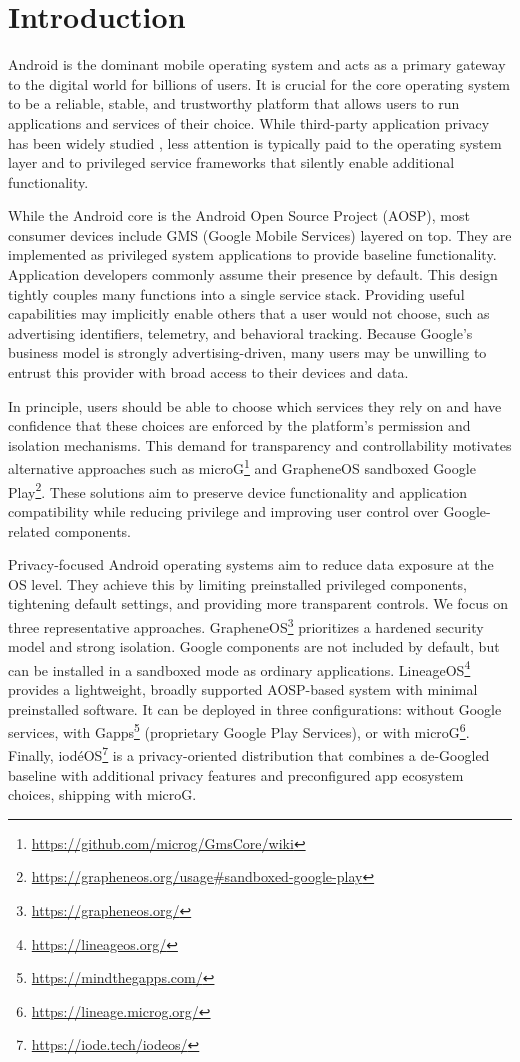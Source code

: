 \section{Introduction}
Android is the dominant mobile operating system and acts as a primary gateway to the digital world for billions of users. It is crucial for the core operating system to be a reliable, stable, and trustworthy platform that allows users to run applications and services of their choice. While third-party application privacy has been widely studied \cite{appDataCollection1,appDataCollection2,appDataCollection3,appDataCollection4}, less attention is typically paid to the operating system layer and to privileged service frameworks that silently enable additional functionality.

While the Android core is the Android Open Source Project (AOSP), most consumer devices include GMS (Google Mobile Services) layered on top. They are implemented as privileged system applications to provide baseline functionality. Application developers commonly assume their presence by default. This design tightly couples many functions into a single service stack. Providing useful capabilities may implicitly enable others that a user would not choose, such as advertising identifiers, telemetry, and behavioral tracking. Because Google’s business model is strongly advertising-driven, many users may be unwilling to entrust this provider with broad access to their devices and data.

In principle, users should be able to choose which services they rely on and have confidence that these choices are enforced by the platform’s permission and isolation mechanisms. This demand for transparency and controllability motivates alternative approaches such as microG\footnote{\url{https://github.com/microg/GmsCore/wiki}} and GrapheneOS sandboxed Google Play\footnote{\url{https://grapheneos.org/usage\#sandboxed-google-play}}. These solutions aim to preserve device functionality and application compatibility while reducing privilege and improving user control over Google-related components.

Privacy-focused Android operating systems aim to reduce data exposure at the OS level. They achieve this by limiting preinstalled privileged components, tightening default settings, and providing more transparent controls. We focus on three representative approaches. GrapheneOS\footnote{\url{https://grapheneos.org/}} prioritizes a hardened security model and strong isolation. Google components are not included by default, but can be installed in a sandboxed mode as ordinary applications. LineageOS\footnote{\url{https://lineageos.org/}} provides a lightweight, broadly supported AOSP-based system with minimal preinstalled software. It can be deployed in three configurations: without Google services, with Gapps\footnote{\url{https://mindthegapps.com/}} (proprietary Google Play Services), or with microG\footnote{\url{https://lineage.microg.org/}}. Finally, iod\'eOS\footnote{\url{https://iode.tech/iodeos/}} is a privacy-oriented distribution that combines a de-Googled baseline with additional privacy features and preconfigured app ecosystem choices, shipping with microG.

